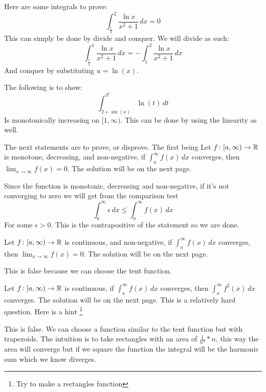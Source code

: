 \documentclass[11pt,a4paper]{article}
\begin{document}
	\newpage
	
	Here are some integrals to prove:
	\[
		\int_{\frac{1}{2}}^{2}{\frac{\ln x}{x^2+1}\,dx} = 0
	\]
	This can simply be done by divide and conquer. We will divide as such:
	\[
		\int_{\frac{1}{2}}^{1}{\frac{\ln x}{x^2+1}\,dx} = 
		-\int_{1}^{2}{\frac{\ln x}{x^2+1}\,dx}
	\]
	And conquer by substituting $u = \ln (x)$.
	
	\newpage
	
	The following is to show:
	\[
		\int_{2+\sin(x)}^{3^x}{\ln(t)\,dt}
	\]
	Is monotonically increasing on $[1,\infty)$. This can be done by using
	the linearity as well.
	
	\newpage
	
	The next statements are to prove, or disprove. The first being
	Let $f\colon[a,\infty)\to\mathbb{R}$ is monotone, decreasing, and non-negative,
	if $\int_{a}^{\infty}{f(x)\,dx}$ converges, then 
	$\lim_{x\to\infty}{f(x)} = 0$. The solution will be on the next page.
	
	\newpage
	
	Since the function is monotonic, decreasing and non-negative, 
	if it's not converging to zero we will get from the comparison test
	\[
		\int_{a}^{\infty}{\epsilon\,dx} \le \int_{a}^{\infty}{f(x)\,dx}
	\]
	For some $\epsilon > 0$. This is the contrapositive of the statement
	so we are done.
	
	\newpage
	
	Let $f\colon[a,\infty)\to\mathbb{R}$ is continuous, and non-negative,
	if $\int_{a}^{\infty}{f(x)\,dx}$ converges, then 
	$\lim_{x\to\infty}{f(x)} = 0$. The solution will be on the next page.
	
	\newpage
	
	This is false because we can choose the tent function.
	
	\newpage
	
	Let $f\colon[a,\infty)\to\mathbb{R}$ is continuous,
	if $\int_{a}^{\infty}{f(x)\,dx}$ converges, then 
	$\int_{a}^{\infty}{f^2(x)\,dx}$ converges. 
	The solution will be on the next page. This is a relatively hard question.
	Here is a hint \footnote{Try to make a rectangles function}

	\newpage
	
	This is false. We can choose a function similar to the tent function but
	with trapezoids. The intuition is to take rectangles with an area of 
	$\frac{1}{n^3} * n$, this way the area will converge but if we square
	the function the integral will be the harmonic sum which we know diverges.
	
	\newpage
	
\end{document}
